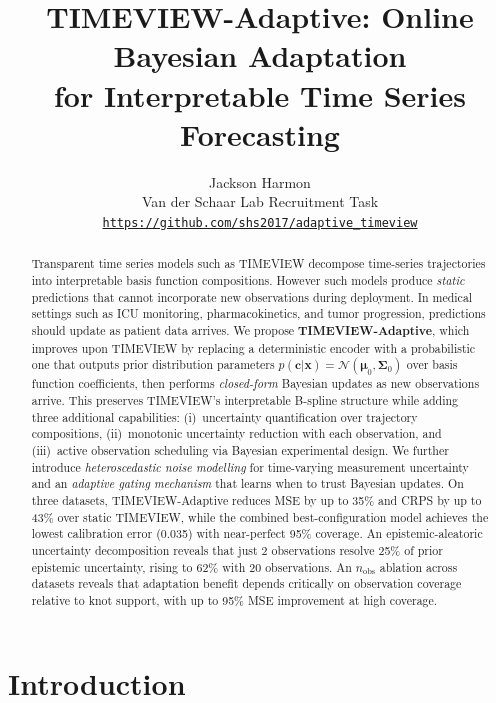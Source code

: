 \documentclass[final]{article}
\title{TIMEVIEW-Adaptive: Online Bayesian Adaptation\\for Interpretable Time Series Forecasting}
\author{
  Jackson Harmon\\
  \small Van der Schaar Lab Recruitment Task\\
  \small\texttt{\url{https://github.com/shs2017/adaptive_timeview}}
}
\begin{document}
\maketitle

\begin{abstract}
Transparent time series models such as TIMEVIEW decompose time-series trajectories into interpretable basis function compositions. However such models produce \emph{static} predictions that cannot incorporate new observations during deployment. In medical settings such as ICU monitoring, pharmacokinetics, and tumor progression, predictions should update as patient data arrives. We propose \textbf{TIMEVIEW-Adaptive}, which improves upon TIMEVIEW by replacing a deterministic encoder with a probabilistic one that outputs prior distribution parameters $p(\mathbf{c}|\mathbf{x}) = \mathcal{N}(\boldsymbol{\mu}_0, \boldsymbol{\Sigma}_0)$ over basis function coefficients, then performs \emph{closed-form} Bayesian updates as new observations arrive. This preserves TIMEVIEW's interpretable B-spline structure while adding three additional capabilities: (i)~uncertainty quantification over trajectory compositions, (ii)~monotonic uncertainty reduction with each observation, and (iii)~active observation scheduling via Bayesian experimental design. We further introduce \emph{heteroscedastic noise modelling} for time-varying measurement uncertainty and an \emph{adaptive gating mechanism} that learns when to trust Bayesian updates. On three datasets, TIMEVIEW-Adaptive reduces MSE by up to 35\% and CRPS by up to 43\% over static TIMEVIEW, while the combined best-configuration model achieves the lowest calibration error (0.035) with near-perfect 95\% coverage. An epistemic-aleatoric uncertainty decomposition reveals that just 2 observations resolve 25\% of prior epistemic uncertainty, rising to 62\% with 20 observations. An $n_{\mathrm{obs}}$ ablation across datasets reveals that adaptation benefit depends critically on observation coverage relative to knot support, with up to 95\% MSE improvement at high coverage.
\end{abstract}

\section{Introduction}
\label{sec:intro}
\end{document}
